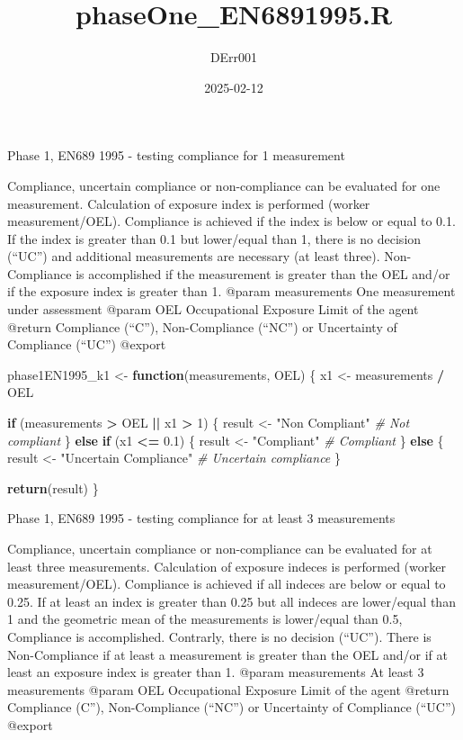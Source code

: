 \documentclass[
]{article}
\title{phaseOne\_EN6891995.R}
\author{DErr001}
\date{2025-02-12}
\newenvironment{Shaded}{\begin{snugshade}}{\end{snugshade}}
\newcommand{\CommentTok}[1]{\textcolor[rgb]{0.56,0.35,0.01}{\textit{#1}}}
\newcommand{\ControlFlowTok}[1]{\textcolor[rgb]{0.13,0.29,0.53}{\textbf{#1}}}
\newcommand{\DecValTok}[1]{\textcolor[rgb]{0.00,0.00,0.81}{#1}}
\newcommand{\FloatTok}[1]{\textcolor[rgb]{0.00,0.00,0.81}{#1}}
\newcommand{\FunctionTok}[1]{\textcolor[rgb]{0.13,0.29,0.53}{\textbf{#1}}}
\newcommand{\NormalTok}[1]{#1}
\newcommand{\OtherTok}[1]{\textcolor[rgb]{0.56,0.35,0.01}{#1}}
\newcommand{\SpecialCharTok}[1]{\textcolor[rgb]{0.81,0.36,0.00}{\textbf{#1}}}
\newcommand{\StringTok}[1]{\textcolor[rgb]{0.31,0.60,0.02}{#1}}
\begin{document}
\maketitle

Phase 1, EN689 1995 - testing compliance for 1 measurement

Compliance, uncertain compliance or non-compliance can be evaluated for
one measurement. Calculation of exposure index is performed (worker
measurement/OEL). Compliance is achieved if the index is below or equal
to 0.1. If the index is greater than 0.1 but lower/equal than 1, there
is no decision (``UC'') and additional measurements are necessary (at
least three). Non-Compliance is accomplished if the measurement is
greater than the OEL and/or if the exposure index is greater than 1.
@param measurements One measurement under assessment @param OEL
Occupational Exposure Limit of the agent @return Compliance (``C''),
Non-Compliance (``NC'') or Uncertainty of Compliance (``UC'') @export

\begin{Shaded}
\begin{Highlighting}[]
\NormalTok{phase1EN1995\_k1 }\OtherTok{\textless{}{-}} \ControlFlowTok{function}\NormalTok{(measurements, OEL) \{}
\NormalTok{  x1 }\OtherTok{\textless{}{-}}\NormalTok{ measurements }\SpecialCharTok{/}\NormalTok{ OEL}
  
  \ControlFlowTok{if}\NormalTok{ (measurements }\SpecialCharTok{\textgreater{}}\NormalTok{ OEL }\SpecialCharTok{||}\NormalTok{ x1 }\SpecialCharTok{\textgreater{}} \DecValTok{1}\NormalTok{) \{}
\NormalTok{    result }\OtherTok{\textless{}{-}} \StringTok{"Non Compliant"}  \CommentTok{\# Not compliant}
\NormalTok{  \} }\ControlFlowTok{else} \ControlFlowTok{if}\NormalTok{ (x1 }\SpecialCharTok{\textless{}=} \FloatTok{0.1}\NormalTok{) \{}
\NormalTok{    result }\OtherTok{\textless{}{-}} \StringTok{"Compliant"}   \CommentTok{\# Compliant}
\NormalTok{  \} }\ControlFlowTok{else}\NormalTok{ \{}
\NormalTok{    result }\OtherTok{\textless{}{-}} \StringTok{"Uncertain Compliance"}  \CommentTok{\# Uncertain compliance}
\NormalTok{  \}}
  
  \FunctionTok{return}\NormalTok{(result)}
\NormalTok{\}}
\end{Highlighting}
\end{Shaded}

Phase 1, EN689 1995 - testing compliance for at least 3 measurements

Compliance, uncertain compliance or non-compliance can be evaluated for
at least three measurements. Calculation of exposure indeces is
performed (worker measurement/OEL). Compliance is achieved if all
indeces are below or equal to 0.25. If at least an index is greater than
0.25 but all indeces are lower/equal than 1 and the geometric mean of
the measurements is lower/equal than 0.5, Compliance is accomplished.
Contrarly, there is no decision (``UC''). There is Non-Compliance if at
least a measurement is greater than the OEL and/or if at least an
exposure index is greater than 1. @param measurements At least 3
measurements @param OEL Occupational Exposure Limit of the agent @return
Compliance (C''), Non-Compliance (``NC'') or Uncertainty of Compliance
(``UC'') @export
\end{document}

